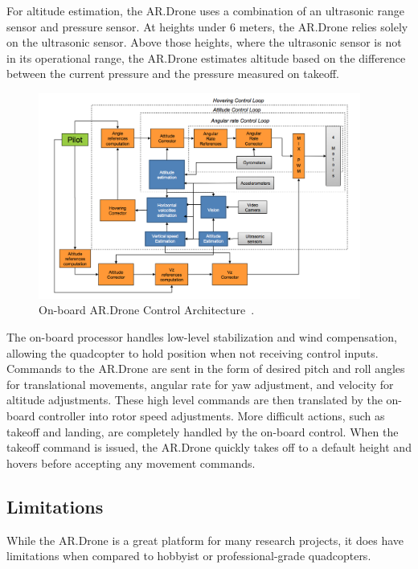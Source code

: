         For altitude estimation, the AR.Drone uses a combination of an ultrasonic range sensor and pressure sensor. At heights under 6 meters, the AR.Drone relies solely on the ultrasonic sensor. Above those heights, where the ultrasonic sensor is not in its operational range, the AR.Drone estimates altitude based on the difference between the current pressure and the pressure measured on takeoff. 

        \begin{figure}[ht]
            \centering
            \includegraphics[width=400px]{../images/control.png}
            \caption{On-board AR.Drone Control Architecture~\cite{Bristeau}.}\label{fig:control}
        \end{figure}

        The on-board processor handles low-level stabilization and wind compensation, allowing the quadcopter to hold position when not receiving control inputs. Commands to the AR.Drone are sent in the form of desired pitch and roll angles for translational movements, angular rate for yaw adjustment, and velocity for altitude adjustments. These high level commands are then translated by the on-board controller into rotor speed adjustments. More difficult actions, such as takeoff and landing, are completely handled by the on-board control. When the takeoff command is issued, the AR.Drone quickly takes off to a default height and hovers before accepting any movement commands.



    \subsection{Limitations}

        While the AR.Drone is a great platform for many research projects, it does have limitations when compared to hobbyist or professional-grade quadcopters.

